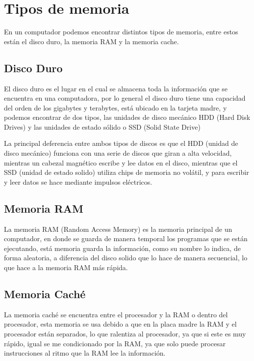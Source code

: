 \documentclass{article}
\begin{document}
\section{Tipos de memoria} \label{contenido}
En un computador podemos encontrar distintos tipos de memoria, entre estos están el disco duro, la memoria RAM y la memoria cache.

\subsection{Disco Duro}
El disco duro es el lugar en el cual se almacena toda la información que se encuentra en una computadora, por lo general el disco duro tiene una capacidad del orden de los gigabytes y terabytes, está ubicado en la tarjeta madre, y podemos encontrar de dos tipos, las unidades de disco mecánico HDD (Hard Disk Drives) y las unidades de estado sólido o SSD (Solid State Drive)
\vspace{0.5cm}

La principal deferencia entre ambos tipos de discos es que el HDD (unidad de disco mecánico) funciona con una serie de discos que giran a alta velocidad, mientras un cabezal magnético escribe y lee datos en el disco, mientras que el SSD (unidad de estado solido) utiliza chips de memoria no volátil, y para escribir y leer datos se hace mediante impulsos eléctricos.\cite{andres2017cual} 

\subsection{Memoria RAM}
La memoria RAM (Random Access Memory) es la memoria principal de un computador, en donde se guarda de manera temporal los programas que se están ejecutando, está memoria  guarda la información, como su nombre lo indica, de forma aleatoria, a diferencia del disco solido que lo hace de manera secuencial, lo que hace a la memoria RAM más rápida.\cite{rebollo2011memoria}

\subsection{Memoria Caché}
La memoria caché se encuentra entre el procesador y la RAM o dentro del procesador, esta memoria se usa debido a que en la placa madre la RAM y el procesador están separados, lo que ralentiza al procesador, ya que si este es muy rápido, igual se me condicionado por la RAM, ya que solo puede procesar instrucciones al ritmo que la RAM lee la información.
\vspace{0.5cm}
\end{document}

